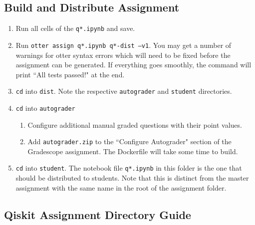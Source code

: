 \documentclass[12pt]{article}
\begin{document}
\subsection*{Build and Distribute Assignment}
\begin{enumerate}[font=\bfseries]
    \item Run all cells of the \texttt{q*.ipynb} and save.
    \item Run \texttt{otter assign q*.ipynb q*-dist --v1}. You may get a number of warnings for otter syntax errors which will need to be fixed before the assignment can be generated. If everything goes smoothly, the command will print ``All tests passed!" at the end.
    \item \texttt{cd} into \texttt{dist}. Note the respective \texttt{autograder} and \texttt{student} directories.
    \item \texttt{cd} into \texttt{autograder}
    \begin{enumerate}
        \item Configure additional manual graded questions with their point values.
        \item Add \texttt{autograder.zip} to the ``Configure Autograder" section of the Gradescope assignment. The Dockerfile will take some time to build.
    \end{enumerate}
    \item \texttt{cd} into \texttt{student}. The notebook file \texttt{q*.ipynb} in this folder is the one that should be distributed to students. Note that this is distinct from the master assignment with the same name in the root of the assignment folder.
\end{enumerate}
\newpage
\subsection*{Qiskit Assignment Directory Guide}
    
\end{document}
